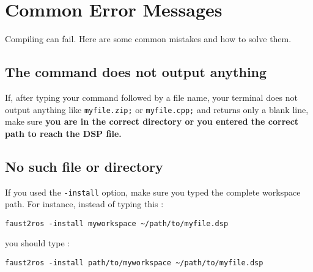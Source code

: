 \chapter{Common Error Messages}
\label{chap:errors}
Compiling can fail. Here are some common mistakes and how to solve them.
\section{The command does not output anything}
If, after typing your command followed by a file name, your terminal does not output anything like \lstinline'myfile.zip;' or \lstinline'myfile.cpp;' and returns only a blank line, make sure \textbf{you are in the correct directory or you entered the correct path to reach the DSP file.} 

\section{No such file or directory}
If you used the \lstinline'-install' option, make sure you typed the complete workspace path.
For instance, instead of typing this :
\begin{lstlisting}
faust2ros -install myworkspace ~/path/to/myfile.dsp
\end{lstlisting}
you should type :
\begin{lstlisting}
faust2ros -install path/to/myworkspace ~/path/to/myfile.dsp
\end{lstlisting}

%

